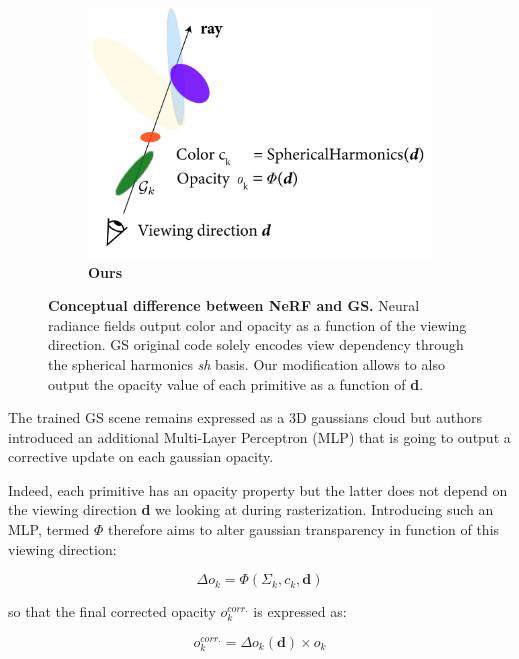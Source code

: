 \begin{figure}[htpb!]
\begin{subfigure}[b]{0.31\linewidth}
    \includegraphics[width=\linewidth]{images/gaussiansplatting/gs.png}
    \caption{\textbf{Ours}}
    \label{fig:gs-ray}
  \end{subfigure}
  \caption{\textbf{Conceptual difference between NeRF and GS.} Neural radiance fields output color and opacity as a function of the viewing direction. GS original code solely encodes view dependency through the spherical harmonics \textit{sh} basis. Our modification allows to also output the opacity value of each primitive as a function of \textbf{d}. }
  \label{fig:gs-nerf}
\end{figure}

The trained GS scene remains expressed as a 3D gaussians cloud but authors introduced an additional Multi-Layer Perceptron (MLP) that is going to output a corrective update on each gaussian opacity. 

Indeed, each primitive has an opacity property but the latter does not depend on the viewing direction \textbf{d} we looking at during rasterization. Introducing such an MLP, termed $\Phi$ therefore aims to alter gaussian transparency in function of this viewing direction: 

\begin{equation}
\Delta o_{k} = \Phi(\Sigma_{k},c_{k},\textbf{d}) 
\end{equation}

so that the final corrected opacity $o_{k}^{corr.}$ is expressed as: 

\begin{equation}
o_{k}^{corr.} = \Delta o_{k}(\textbf{d}) \times o_{k} 
\end{equation}

